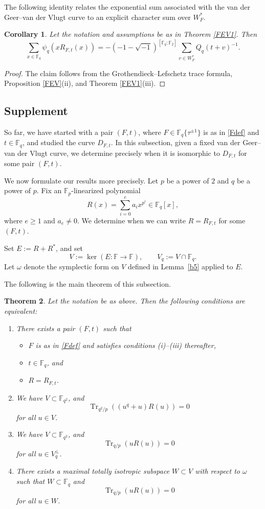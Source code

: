 \documentclass[12pt,a4paper]{amsart}
\newtheorem{theorem}{Theorem}[section]
\newtheorem{corollary}[theorem]{Corollary}
\theoremstyle{definition}
\def\F{{\mathbb F}}
\theoremstyle{remark}
\DeclareMathOperator{\Tr}{Tr}
\begin{document}
 
The following identity relates the exponential sum associated with the van der Geer--van der Vlugt curve to an explicit character sum over $W_F^\ast$. 
 \begin{corollary}\label{gl}
Let the notation and assumptions be as in Theorem \ref{FEV1}. 
Then 
\[
\sum_{x \in \F_q} \psi_q(x R_{F,t}(x))
=-(-1-\sqrt{-1})^{[\F_q:\F_2]} \sum_{v \in W_F^\ast} 
Q_q(t+v)^{-1}. 
\]
\end{corollary}
\begin{proof}
The claim follows from the Grothendieck--Lefschetz trace formula, Proposition \ref{FEV}(ii), and 
Theorem \ref{FEV1}(iii). 
\end{proof}






\subsection{Supplement}
So far, we have started with a pair $(F,t)$, where  $F\in\F_q\{\tau^{\pm1}\}$ is as in \eqref{Fdef} and $t\in\F_q$, and studied the curve $D_{F,t}$. In this subsection, given a fixed van der Geer--van der Vlugt curve, we determine precisely  when it is isomorphic to $D_{F,t}$ for some pair $(F,t)$. 

We now formulate our results more precisely. Let $p$ be a power of $2$ and $q$ be a power of $p$. Fix an $\F_p$-linearized polynomial 
\[R(x)=\sum_{i=0}^ea_ix^{p^i}\in \F_q[x],\]
where $e\geq1$ and $a_e\neq0$. We determine when we can write $R=R_{F,t}$ for some $(F,t)$. 


Set $E:=R+R^\ast$, and set 
\[
V:=\ker (E\colon \F\to \F), \qquad V_q:=V\cap \F_q. 
\]
Let $\omega$ denote the symplectic form on $V$ defined in Lemma~\ref{b5} applied to $E$. 


The following is the main theorem of this subsection. 
\begin{theorem}\label{detR}
Let the notation be as above. Then the following conditions are equivalent: 
\begin{enumerate}
\item[$(1)$] There exists a pair $(F,t)$ such that 
\begin{itemize}
\item $F$ is  as in \eqref{Fdef} and satisfies conditions \textup{(i)--(iii)} thereafter, 
\item $t\in\F_q$, and 
\item $R=R_{F,t}$. 
\end{itemize}
\item[$(2)$] We have $V\subset \F_{q^2}$, and 
\[\Tr_{q^2/p}((u^q+u)R(u))=0 \] 
for all $u\in V$. 
\item[$(3)$] We have $V\subset \F_{q^2}$, and  
\[\Tr_{q/p}(uR(u))=0\]
for all $u\in V_{q}^\perp$. 
\item[$(4)$] There exists a maximal totally isotropic subspace $W\subset V$ with respect to $\omega$ such that $W\subset \F_q$ and 
\[
\Tr_{q/p}(uR(u))=0
\]
for all $u\in W$. 
\end{enumerate}
\end{theorem} 
\end{document}
